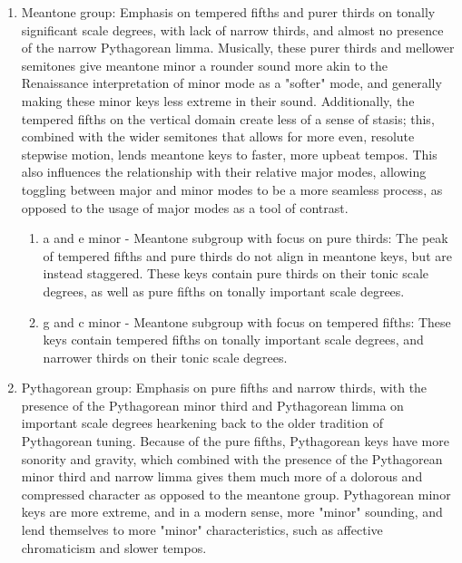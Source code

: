 \begin{enumerate}
\def\labelenumi{\arabic{enumi}.}
\tightlist
\item
  Meantone group: Emphasis on tempered fifths and purer thirds on
  tonally significant scale degrees, with lack of narrow thirds, and
  almost no presence of the narrow Pythagorean limma. Musically, these
  purer thirds and mellower semitones give meantone minor a rounder
  sound more akin to the Renaissance interpretation of minor mode as a
  "softer" mode, and generally making these minor keys less extreme in
  their sound. Additionally, the tempered fifths on the vertical domain
  create less of a sense of stasis; this, combined with the wider
  semitones that allows for more even, resolute stepwise motion, lends
  meantone keys to faster, more upbeat tempos. This also influences the
  relationship with their relative major modes, allowing toggling
  between major and minor modes to be a more seamless process, as
  opposed to the usage of major modes as a tool of contrast.

  \begin{enumerate}
  \def\labelenumii{\arabic{enumii}.}
  \tightlist
  \item
    a and e minor - Meantone subgroup with focus on pure thirds: The
    peak of tempered fifths and pure thirds do not align in meantone
    keys, but are instead staggered. These keys contain pure thirds on
    their tonic scale degrees, as well as pure fifths on tonally
    important scale degrees.
  \item
    g and c minor - Meantone subgroup with focus on tempered fifths:
    These keys contain tempered fifths on tonally important scale
    degrees, and narrower thirds on their tonic scale degrees.
  \end{enumerate}
\item
  Pythagorean group: Emphasis on pure fifths and narrow thirds, with the
  presence of the Pythagorean minor third and Pythagorean limma on
  important scale degrees hearkening back to the older tradition of
  Pythagorean tuning. Because of the pure fifths, Pythagorean keys have
  more sonority and gravity, which combined with the presence of the
  Pythagorean minor third and narrow limma gives them much more of a
  dolorous and compressed character as opposed to the meantone group.
  Pythagorean minor keys are more extreme, and in a modern sense, more
  "minor" sounding, and lend themselves to more "minor" characteristics,
  such as affective chromaticism and slower tempos.


\end{enumerate}
